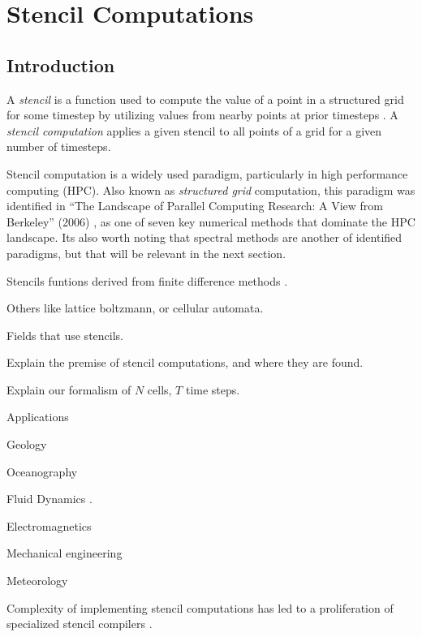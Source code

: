 \section{Stencil Computations}

\subsection{Introduction}

A \textit{stencil} is a function used to compute the value of a point in a structured grid for some timestep by utilizing values from nearby points at prior timesteps \cite{Frigo2005Stencil}.
A \textit{ stencil computation} applies a given stencil to all points of a grid for a given number of timesteps.

Stencil computation is a widely used paradigm, particularly in high performance computing (HPC). 
Also known as \textit{structured grid} computation, this paradigm was identified in  ``The Landscape of Parallel Computing Research: A View from Berkeley'' (2006) 
\cite{Asanovic2006Landscape}, as one of  
seven key numerical methods 
that dominate the HPC landscape. 
Its also worth noting that spectral methods 
are another of identified paradigms, 
but that will be relevant in the next section.

Stencils funtions derived from finite difference methods \cite{Taflove2005Ch9, }. 

Others like lattice boltzmann, or cellular automata.

Fields that use stencils.




Explain the premise of stencil computations, and where they are found.

Explain our formalism of $N$ cells, $T$ time steps.

Applications

Geology \cite{Dursun2009Stencil}

Oceanography \cite{Rainer1992Atlantic}

Fluid Dynamics \cite{Blazek2015Ch1, Ferziger2020, Kruger2017LBM}.

Electromagnetics \cite{Taflove2005Ch9}

Mechanical engineering \cite{Rappaz2003, Stathopoulos2000Material}

Meteorology \cite{Singh2023SPARTA, Avissar1989Weather, Kalnay1990Weather}

Complexity of implementing stencil computations 
has led to a proliferation of specialized stencil compilers 
\cite{Bauer2019PhaseField, Bauer2021lbmpy, Ahmad2022, Tang2011Pochoir, Holewinski2012Stencil}.

